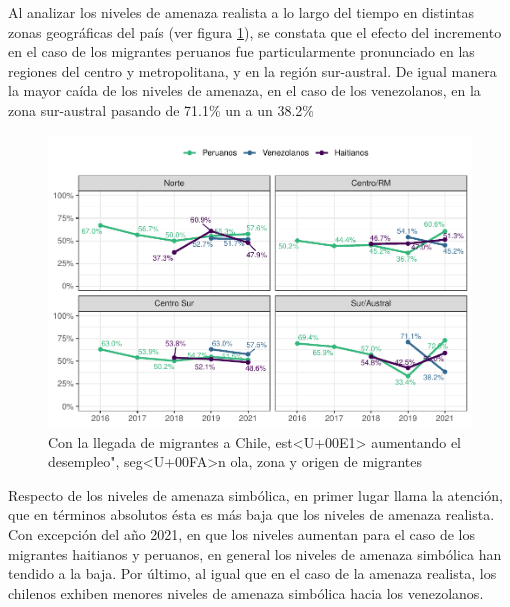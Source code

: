 \documentclass[
  12pt,
]{book}
\begin{document}
Al analizar los niveles de amenaza realista a lo largo del tiempo en distintas zonas geográficas del país (ver figura \ref{fig:amen1-zona}), se constata que el efecto del incremento en el caso de los migrantes peruanos fue particularmente pronunciado en las regiones del centro y metropolitana, y en la región sur-austral. De igual manera la mayor caída de los niveles de amenaza, en el caso de los venezolanos, en la zona sur-austral pasando de 71.1\% un a un 38.2\%

\begin{figure}

{\centering \includegraphics{reporte-elsoc_files/figure-latex/amen1-zona-1} 

}

\caption{Con la llegada de migrantes a Chile, est<U+00E1> aumentando el desempleo", seg<U+00FA>n ola, zona y origen de migrantes}\label{fig:amen1-zona}
\end{figure}

Respecto de los niveles de amenaza simbólica, en primer lugar llama la atención, que en términos absolutos ésta es más baja que los niveles de amenaza realista. Con excepción del año 2021, en que los niveles aumentan para el caso de los migrantes haitianos y peruanos, en general los niveles de amenaza simbólica han tendido a la baja. Por último, al igual que en el caso de la amenaza realista, los chilenos exhiben menores niveles de amenaza simbólica hacia los venezolanos.
\end{document}
